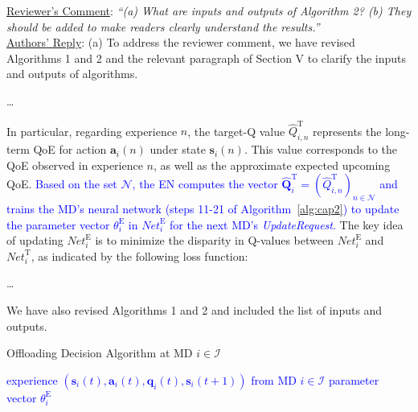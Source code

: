 \documentclass[12pt,draftclsnofoot,onecolumn]{IEEEtran}
\newcommand{\rev}[1]{{\color{blue}#1}} %
\newcommand{\rev}[1]{#1}
\newenvironment{my}[2]%
{\begin{list}{}%
{\setlength{\rightmargin}{#1}\setlength{\leftmargin}{#2}}%


 \item[]{}

} {\end{list}}
\begin{document}
\begin{enumerate}
\begin{my}{1cm}{1cm}
\end{my}\vspace{6mm}
	


	\item \underline{Reviewer's Comment}: 
	\textit{``(a) What are inputs and outputs of Algorithm 2? (b) They should be added to make readers clearly understand the results.''} \\\newline
	\underline{Authors' Reply}: (a) To address the reviewer comment, we have revised Algorithms 1 and 2 and the relevant paragraph of Section V to clarify the inputs and outputs of algorithms.\newline
	
	\begin{my}{1cm}{1cm} 
		\rev{
		
		\dots \color{black}
		
		
		In particular, regarding experience $n$, the target-Q value $\hat{Q}_{i,n}^{\text{T}}$ represents the long-term QoE for action $\boldsymbol{a}_i(n)$ under state $\boldsymbol{s}_i(n)$. This value corresponds to the QoE observed in experience $n$, as well as the approximate expected upcoming QoE. 
			\textcolor{blue}{Based on the set $\mathcal{N}$, the EN computes the vector $\hat{\mathbf{Q}}_i^{\text{T}} = (\hat{Q}^{\text{T}}_{i,n})_{n \in \mathcal{N}}$ and trains the MD's neural network (steps 11-21 of Algorithm~\ref{alg:cap2}) to update the parameter vector $\theta^{\text{E}}_i$ in $\textit{Net}_i^{\text{E}}$ for the next MD's \textit{UpdateRequest}.} The key idea of updating $\textit{Net}_i^{\text{E}}$ is to minimize the disparity in Q-values between $\textit{Net}_i^{\text{E}}$ and $\textit{Net}_i^{\text{T}}$, as indicated by the following loss function:
			
			\dots}
	\end{my}
		
	We have also revised Algorithms 1 and 2 and included the list of inputs and outputs.\\	
	

\begin{my}{0.5cm}{0.5cm}	
\rev{\begin{minipage}[b]{0.87\textwidth} 
	\begin{algorithm}[H] \caption{Offloading Decision Algorithm at MD $i \in \mathcal{I}$}\label{alg:cap2} \centering 
		\begin{algorithmic}[1] \renewcommand{\algorithmicrequire}{\textbf{\textcolor{blue}{Input:}}} \renewcommand{\algorithmicensure}{\textbf{\textcolor{blue}{Output:}}} \Require \textcolor{blue}{experience $(\boldsymbol{s}_i(t), \boldsymbol{a}_i(t), \boldsymbol{q}_i(t), \boldsymbol{s}_i(t+1))$ from MD $i \in \mathcal{I}$} \Ensure \textcolor{blue}{parameter vector $\theta_i^{\text{E}}$} 
	\end{algorithmic} 
\end{algorithm} 
\end{minipage}
\vspace{5mm}

}
\end{my}
\end{enumerate}
\end{document}

